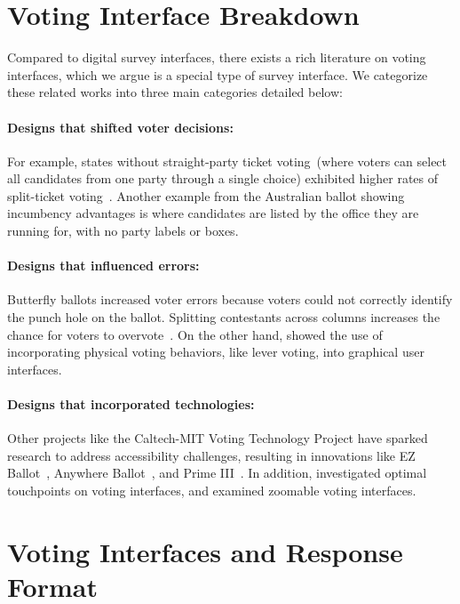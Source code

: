 \section{Voting Interface Breakdown}\label{apdx:relatedVoting}
Compared to digital survey interfaces, there exists a rich literature on voting interfaces, which we argue is a special type of survey interface. We categorize these related works into three main categories detailed below:

\paragraph{Designs that shifted voter decisions: } For example, states without straight-party ticket voting~(where voters can select all candidates from one party through a single choice) exhibited higher rates of split-ticket voting~\cite{engstrom2020politics}. Another example from the Australian ballot showing incumbency advantages is where candidates are listed by the office they are running for, with no party labels or boxes.
\paragraph{Designs that influenced errors: } Butterfly ballots increased voter errors because voters could not correctly identify the punch hole on the ballot. Splitting contestants across columns increases the chance for voters to overvote~\cite{quesenberyOpinionGoodDesign2020}. On the other hand, \textcite{everettElectronicVotingMachines2008} showed the use of incorporating physical voting behaviors, like lever voting, into graphical user interfaces.

\paragraph{Designs that incorporated technologies: } Other projects like the Caltech-MIT Voting Technology Project have sparked research to address accessibility challenges, resulting in innovations like EZ Ballot~\cite{leeUniversalDesignBallot2016}, Anywhere Ballot~\cite{summers2014making}, and Prime III~\cite{dawkinsPrimeIIIInnovative2009}. In addition, \textcite{gilbertAnomalyDetectionElectronic2013} investigated optimal touchpoints on voting interfaces, and \textcite{conradElectronicVotingEliminates2009} examined zoomable voting interfaces.

\section{Voting Interfaces and Response Format}

